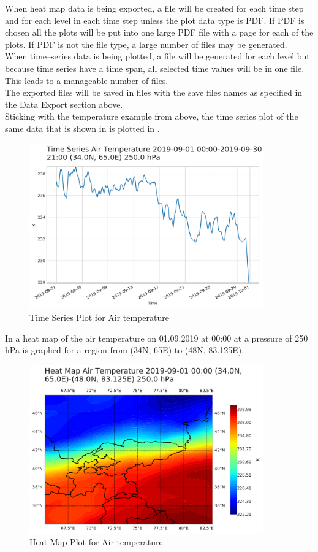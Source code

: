 \documentclass[../00_main.tex]{subfiles}
\begin{document}
When heat map data is being exported, a file will be created for each time step
and for each level in each time step unless the plot data type is PDF. If PDF
is chosen all the plots will be put into one large PDF file with a page for
each of the plots. If PDF is not the file type, a large number of
files may be generated.\\
When time--series data is being plotted, a file will be generated for each
level but because time series have a time span, all selected time values will
be in one file. This leads to a manageable number of files.\\
The exported files will be saved in files with the save files names as
specified in the Data Export section above.\\
Sticking with the temperature example from above, the time series plot of the
same data that is shown in  is plotted in .
\begin{figure}[h]
    \center
    \includegraphics[width=0.9\textwidth]{../graphics/plt01}
    \caption{Time Series Plot for Air temperature}
    \label{plt:dpl01}
\end{figure}
In  a heat map of the air temperature on 01.09.2019 at 00:00
at a pressure of 250 hPa is graphed for a region from (34\textdegree{}N,
65\textdegree{}E) to (48\textdegree{}N, 83.125\textdegree{}E).
\begin{figure}[H]
    \center
    \includegraphics[width=0.9\textwidth]{../graphics/plt02}
    \caption{Heat Map Plot for Air temperature}
    \label{plt:dpl02}
\end{figure}
\end{document}
